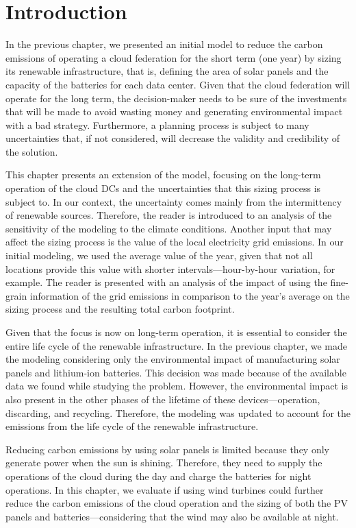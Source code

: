 \section{Introduction}

In the previous chapter, we presented an initial model to reduce the carbon emissions of operating a cloud federation for the short term (one year) by sizing its renewable infrastructure, that is, defining the area of solar panels and the capacity of the batteries for each data center. Given that the cloud federation will operate for the long term, the decision-maker needs to be sure of the investments that will be made to avoid wasting money and generating environmental impact with a bad strategy. Furthermore, a planning process is subject to many uncertainties that, if not considered, will decrease the validity and credibility of the solution.

This chapter presents an extension of the model, focusing on the long-term operation of the cloud DCs and the uncertainties that this sizing process is subject to. In our context, the uncertainty comes mainly from the intermittency of renewable sources. Therefore, the reader is introduced to an analysis of the sensitivity of the modeling to the climate conditions. Another input that may affect the sizing process is the value of the local electricity grid emissions. In our initial modeling, we used the average value of the year, given that not all locations provide this value with shorter intervals---hour-by-hour variation, for example. The reader is presented with an analysis of the impact of using the fine-grain information of the grid emissions in comparison to the year's average on the sizing process and the resulting total carbon footprint.

Given that the focus is now on long-term operation, it is essential to consider the entire life cycle of the renewable infrastructure. In the previous chapter, we made the modeling considering only the environmental impact of manufacturing solar panels and lithium-ion batteries. This decision was made because of the available data we found while studying the problem. However, the environmental impact is also present in the other phases of the lifetime of these devices---operation, discarding, and recycling. Therefore, the modeling was updated to account for the emissions from the life cycle of the renewable infrastructure.

Reducing carbon emissions by using solar panels is limited because they only generate power when the sun is shining. Therefore, they need to supply the operations of the cloud during the day and charge the batteries for night operations. In this chapter, we evaluate if using wind turbines could further reduce the carbon emissions of the cloud operation and the sizing of both the PV panels and batteries---considering that the wind may also be available at night.

